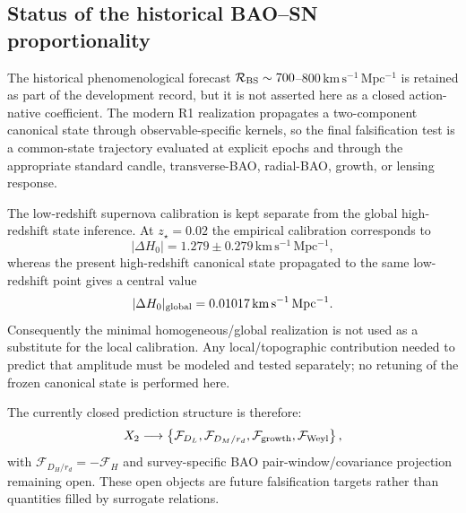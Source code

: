 \subsection{Status of the historical BAO--SN proportionality}
\label{sec:r1-bao-sn-status-v15}

The historical phenomenological forecast
$\mathcal R_{\rm BS}\sim700$--$800\,
\mathrm{km\,s^{-1}\,Mpc^{-1}}$ is retained as part of the development
record, but it is not asserted here as a closed action-native coefficient.
The modern R1 realization propagates a two-component canonical state through
observable-specific kernels, so the final falsification test is a common-state
trajectory evaluated at explicit epochs and through the appropriate standard
candle, transverse-BAO, radial-BAO, growth, or lensing response.

The low-redshift supernova calibration is kept separate from the global
high-redshift state inference. At $z_\star=0.02$ the empirical
calibration corresponds to
\[
|\Delta H_0|=1.279\pm0.279\,
\mathrm{km\,s^{-1}\,Mpc^{-1}},
\]
whereas the present high-redshift canonical state propagated to the same
low-redshift point gives a central value
\[
|\Delta H_0|_{\rm global}=0.01017\,
\mathrm{km\,s^{-1}\,Mpc^{-1}}.
\]
Consequently the minimal homogeneous/global realization is not used as a
substitute for the local calibration. Any local/topographic contribution
needed to predict that amplitude must be modeled and tested separately; no
retuning of the frozen canonical state is performed here.

The currently closed prediction structure is therefore:
\[
X_2\longrightarrow
\left\{
\mathcal F_{D_L},
\mathcal F_{D_M/r_d},
\mathcal F_{\rm growth},
\mathcal F_{\rm Weyl}
\right\},
\]
with $\mathcal F_{D_H/r_d}=-\mathcal F_H$ and survey-specific BAO
pair-window/covariance projection remaining open. These open objects are
future falsification targets rather than quantities filled by surrogate
relations.
